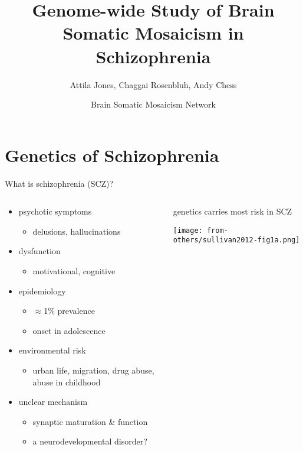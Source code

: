 \documentclass[usenames,dvipsnames]{beamer}
\title{Genome-wide Study of Brain Somatic Mosaicism in Schizophrenia}
\author{Attila Jones, Chaggai Rosenbluh, Andy Chess}
\date{Brain Somatic Mosaicism Network}
\begin{document}
\maketitle

\section{Genetics of Schizophrenia}

\begin{frame}{What is schizophrenia (SCZ)?}
\begin{columns}[t]
\begin{column}{0.55\textwidth}
	\begin{itemize}
                \item psychotic symptoms
			\begin{itemize}
				\item delusions, hallucinations
			\end{itemize}
                \item dysfunction
			\begin{itemize}
				\item motivational, cognitive
			\end{itemize}
                \item epidemiology
			\begin{itemize}
				\item \(\approx\)1\% prevalence
				\item onset in adolescence
			\end{itemize}
                \item environmental risk
			\begin{itemize}
				\item urban life, migration, drug abuse,
					abuse in childhood
			\end{itemize}
                \item unclear mechanism
			\begin{itemize}
				\item synaptic maturation \& 
					function
                                \item a neurodevelopmental disorder?
			\end{itemize}
	\end{itemize}
\end{column}

\begin{column}{0.45\textwidth}
	genetics carries most risk in SCZ

\texttt{[image: from-others/sullivan2012-fig1a.png]}
\end{column}
\end{columns}
\end{frame}
\end{document}
